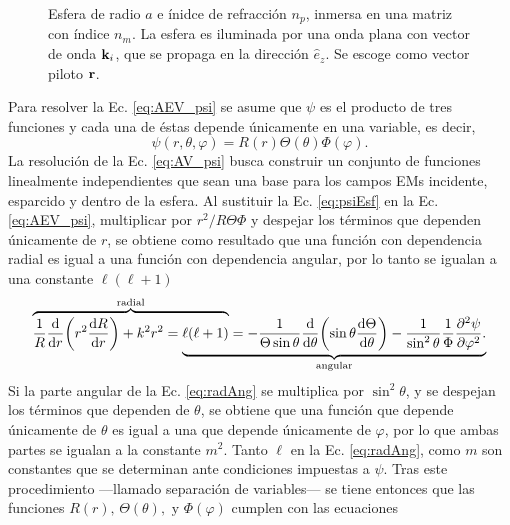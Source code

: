 \begin{figure}[h!]
		\caption{ Esfera de radio $a$ e ínidce de refracción $n_p$, inmersa en una matriz con índice $n_m$. La esfera es iluminada por una onda plana con vector de onda $\vb{k}_i$, que se propaga en la dirección $\hat{e}_z$. Se escoge como vector piloto $\vb{r}$.}\label{fig:EsferaA}
	\end{figure}	
	

Para resolver la Ec. \eqref{eq:AEV_psi} se asume que $\psi$ es el producto de tres funciones y cada una de éstas depende únicamente en una variable, es decir,
	\begin{equation}
	\psi (r,\theta, \varphi) = R(r)\Theta(\theta) \Phi(\varphi). \label{eq:psiEsf}
	\end{equation}
La resolución de la Ec. \eqref{eq:AV_psi} busca construir un conjunto de funciones linealmente independientes que sean una base para los campos EMs incidente, esparcido y dentro de la esfera. Al sustituir la Ec. \eqref{eq:psiEsf} en la Ec. \eqref{eq:AEV_psi},  multiplicar por $r^2/R\Theta\Phi$ y despejar los términos que dependen únicamente de $r$, se obtiene como resultado que una función con dependencia radial es igual a una función con dependencia angular, por lo tanto se igualan a una constante $\ell (\ell +1)$
	\begin{equation}
\mathrlap{\overbrace{\phantom{\frac{1}{R} \dv{r}\qty(r^2\dv{R}{r})+  k^2 r^2 = \ell (\ell +1)}}^{\text{radial}}}
							 \frac{1}{R} \dv{r}\qty(r^2\dv{R}{r})+  k^2 r^2 = 
\mathrlap{\underbrace{\phantom{\ell (\ell +1)=
											-\frac{1}{\Theta\sin\theta}\dv{\theta}\qty(\sin\theta\dv{\Theta}{\theta})
								 			- \frac{1}{\sin^2\theta}\frac{1}{\Phi}\pdv[2]{\psi}{\varphi}. }}_{\text{angular}}}
						 	\ell (\ell +1)=
											-\frac{1}{\Theta\sin\theta}\dv{\theta}\qty(\sin\theta\dv{\Theta}{\theta})
					 						- \frac{1}{\sin^2\theta}\frac{1}{\Phi}\pdv[2]{\psi}{\varphi}.
					 		\label{eq:radAng}
	\end{equation}
Si la parte angular de la Ec. \eqref{eq:radAng} se multiplica por $\sin^2\theta$, y se despejan los términos que dependen de $\theta$, se obtiene que una función que depende únicamente de $\theta$ es igual a una que depende únicamente de $\varphi$, por lo que ambas partes se igualan a la constante $m^2$. Tanto $\ell$ en la Ec. \eqref{eq:radAng}, como $m$ son constantes que se determinan ante condiciones impuestas a $\psi$. Tras este procedimiento ---llamado separación de variables--- se tiene entonces que las funciones $R(r),\, \Theta(\theta), \mbox{ y } \Phi(\varphi)$ cumplen con las ecuaciones
